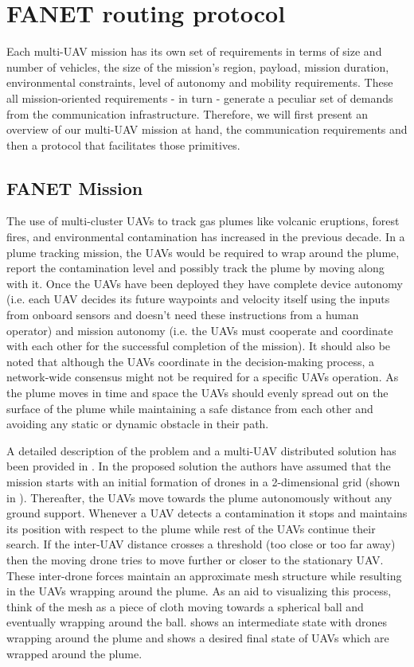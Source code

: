 \chapter{FANET routing protocol}
\label{chap-three}

Each multi-UAV mission has its own set of requirements in terms of size and number of vehicles, the size of the mission's region, payload, mission duration, environmental constraints, level of autonomy and mobility requirements. These all mission-oriented requirements - in turn - generate a peculiar set of demands from the communication infrastructure. Therefore, we will first present an overview of our multi-UAV mission at hand, the communication requirements and then a protocol that facilitates those primitives.

\section{FANET Mission}

The use of multi-cluster UAVs to track gas plumes like volcanic eruptions, forest fires, and environmental contamination has increased in the previous decade. In a plume tracking mission, the UAVs would be required to wrap around the plume, report the contamination level and possibly track the plume by moving along with it. Once the UAVs have been deployed they have complete device autonomy (i.e. each UAV decides its future waypoints and velocity itself using the inputs from onboard sensors and doesn't need these instructions from a human operator) and mission autonomy (i.e. the UAVs must cooperate and coordinate with each other for the successful completion of the mission). It should also be noted that although the UAVs coordinate in the decision-making process, a network-wide consensus might not be required for a specific UAVs operation. As the plume moves in time and space the UAVs should evenly spread out on the surface of the plume while maintaining a safe distance from each other and avoiding any static or dynamic obstacle in their path. 


A detailed description of the problem and a multi-UAV distributed solution has been provided in \cite{8080382}. In the proposed solution the authors have assumed that the mission starts with an initial formation of drones in a 2-dimensional grid (shown in ). Thereafter, the UAVs move towards the plume autonomously without any ground support. Whenever a UAV detects a contamination it stops and maintains its position with respect to the plume while rest of the UAVs continue their search. If the inter-UAV distance crosses a threshold (too close or too far away) then the moving drone tries to move further or closer to the stationary UAV. These inter-drone forces maintain an approximate mesh structure while resulting in the UAVs wrapping around the plume. As an aid to visualizing this process, think of the mesh as a piece of cloth moving towards a spherical ball and eventually wrapping around the ball.  shows an intermediate state with drones wrapping around the plume and  shows a desired final state of UAVs which are wrapped around the plume.
  

